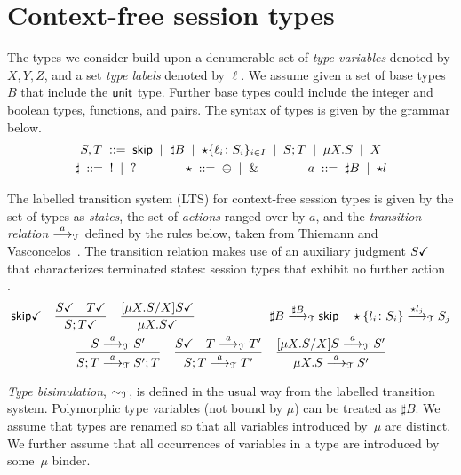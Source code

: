 \section{Context-free session types}
\label{sec:contextfreesession}

The types we consider build upon a denumerable set of \emph{type
  variables} denoted by $X,Y,Z$, and a set \emph{type labels} denoted
by $\ell$. We assume given a set of base types $B$ that include the
$\unitk$ type. Further base types could include the integer and
boolean types, functions, and pairs. The syntax of types is given by the
grammar below.
%
\begin{gather*}
  S,T \grmeq \skipk \grmor \sharp B \grmor 
  \star\{\ell_i\colon S_i\}_{i\in I} \grmor S;T \grmor \mu X.S \grmor X
  \\
  \sharp \grmeq {}! \grmor {}? 
  \qquad \qquad
  \star  \grmeq \oplus \grmor {}\&
  \qquad \qquad
  a \grmeq \sharp B \grmor \star l %
\end{gather*}

The labelled transition system (LTS) for context-free session types is
given by the set of types as \emph{states}, the set of \emph{actions}
ranged over by $a$, and the \emph{transition relation} $\LTSderives$
defined by the rules below, taken from Thiemann and
Vasconcelos~\cite{thiemann2016context}.  The transition relation makes
use of an auxiliary judgment $\DONE{S}$ that characterizes terminated
states: session types that exhibit no further
action~\cite{DBLP:journals/jacm/AcetoH92} .
%
\begin{gather*}
  \DONE{\skipk}
  \quad
  \frac{\DONE{S} \quad \DONE{T}}{\DONE{S; T}}
  \quad
  \frac{\DONE{\subs{\mu X.S}{X} S}}{\DONE{\mu X.S}}
  \qquad \qquad \qquad
  \sharp B \LTSderives[\sharp B] \skipk
  \quad
  \star\{l_i\colon S_i\} \LTSderives[\star l_j] S_j
  \\
  \frac{S \LTSderives S'}{S; T \LTSderives S';T}
  \quad
  \frac{\DONE{S} \quad T \LTSderives T'}{S; T \LTSderives T'}
  \quad
  \frac{\subs{\mu X.S}{X}S \LTSderives S'}{\mu X.S \LTSderives S'}
\end{gather*}

\emph{Type bisimulation}, $\TypeEquiv$, is defined in the usual way from the
labelled transition system. 
%
Polymorphic type variables (not bound by $\mu$) can be treated as
$\sharp B$.
%
We assume that types are renamed so that all variables introduced
by~$\mu$ are distinct. We further assume that all occurrences of
variables in a type are introduced by some~$\mu$ binder.

